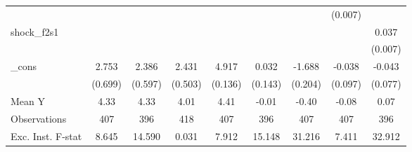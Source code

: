 {\begin{tabular}{l*{8}{c}}
            &                     &                     &                     &                     &                     &                     &     (0.007)         &                     \\
\addlinespace
shock\_f2s1  &                     &                     &                     &                     &                     &                     &                     &       0.037\sym{***}\\
            &                     &                     &                     &                     &                     &                     &                     &     (0.007)         \\
\addlinespace
\_cons      &       2.753\sym{***}&       2.386\sym{***}&       2.431\sym{***}&       4.917\sym{***}&       0.032         &      -1.688\sym{***}&      -0.038         &      -0.043         \\
            &     (0.699)         &     (0.597)         &     (0.503)         &     (0.136)         &     (0.143)         &     (0.204)         &     (0.097)         &     (0.077)         \\
\midrule
Mean Y      &        4.33         &        4.33         &        4.01         &        4.41         &       -0.01         &       -0.40         &       -0.08         &        0.07         \\
Observations&         407         &         396         &         418         &         407         &         396         &         407         &         407         &         396         \\
Exc. Inst. F-stat&       8.645         &      14.590         &       0.031         &       7.912         &      15.148         &      31.216         &       7.411         &      32.912         \\
\bottomrule
\end{tabular}
}
